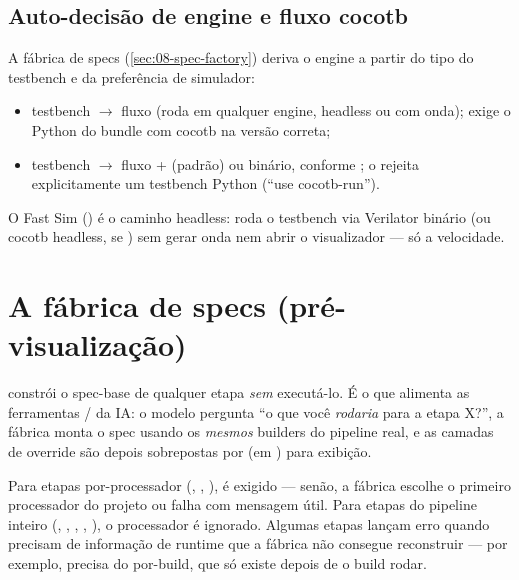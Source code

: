 \subsection{Auto-decisão de engine e fluxo cocotb}

A fábrica de specs (\autoref{sec:08-spec-factory}) deriva o engine a partir do
tipo do testbench e da preferência de simulador:

\begin{itemize}[leftmargin=1.4em]
  \item testbench  $\to$ fluxo  (roda em qualquer
    engine, headless ou com onda); exige o Python do bundle com cocotb na versão
    correta;
  \item testbench  $\to$ fluxo + (padrão) ou
     binário, conforme ; o
     rejeita explicitamente um testbench Python
    (\enquote{use cocotb-run}).
\end{itemize}

\noindent O Fast Sim () é o caminho headless: roda o
testbench via Verilator binário (ou cocotb headless, se ) sem gerar
onda nem abrir o visualizador — só a velocidade.

\section{A fábrica de specs (pré-visualização)}
\label{sec:08-spec-factory}

 constrói o spec-base de qualquer etapa
\emph{sem} executá-lo. É o que alimenta as ferramentas
 /  da IA: o
modelo pergunta \enquote{o que você \emph{rodaria} para a etapa X?}, a fábrica
monta o spec usando os \emph{mesmos} builders do pipeline real, e as camadas de
override são depois sobrepostas por  (em )
para exibição.

Para etapas por-processador (, , ),
 é exigido — senão, a fábrica escolhe o primeiro processador
do projeto ou falha com mensagem útil. Para etapas do pipeline inteiro
(, , , ,
), o processador é ignorado. Algumas etapas lançam erro quando
precisam de informação de runtime que a fábrica não consegue reconstruir — por
exemplo,  precisa do  por-build, que só
existe depois de o build rodar.

